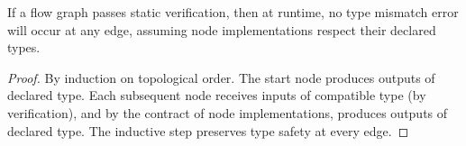 \begin{theorem}
If a flow graph passes static verification, then at runtime, no type mismatch error will occur at any edge, assuming node implementations respect their declared types.
\end{theorem}

\begin{proof}
By induction on topological order. The start node produces outputs of declared type. Each subsequent node receives inputs of compatible type (by verification), and by the contract of node implementations, produces outputs of declared type. The inductive step preserves type safety at every edge.
\end{proof}

